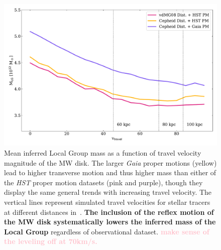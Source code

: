 \documentclass[twocolumn]{aastex631}
\newcommand{\kc}[1]{\textcolor{pink}{\textbf{#1}} }
\begin{document}
\begin{figure}[htb]
    \centering
    \includegraphics[width=\columnwidth]{analyze-runs-MvsV.pdf}
    \caption{\label{fig:mvsv}
    Mean inferred Local Group mass as a function of travel velocity
    magnitude of the MW disk.
    The larger \textit{Gaia} proper motions (yellow) lead to higher transverse
    motion and thus higher mass than either of the \textit{HST} proper motion
    datasets (pink and purple), though they display the same general trends with increasing travel velocity.
    The vertical lines represent simulated travel velocities for
    stellar tracers at different distances in~\cite{Garavito-Camargo2021b}.
    \textbf{The inclusion of the reflex motion of the MW disk systematically
    lowers the inferred mass of the Local Group} regardless of observational
    dataset.
    \kc{make sense of the leveling off at 70km/s.}
    }
  \end{figure}

\end{document}
